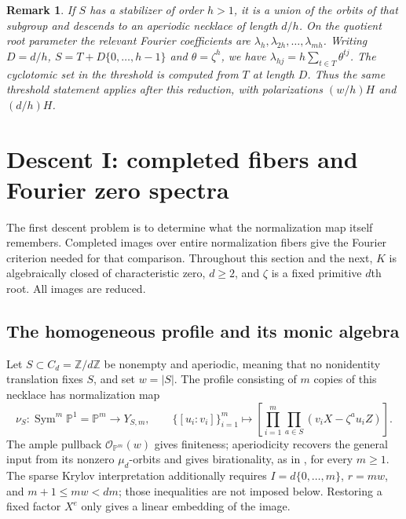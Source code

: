 \documentclass[10pt,fleqn]{article}
\numberwithin{equation}{section}
\newtheorem{remark}[theorem]{Remark}
\newcommand{\PP}{\mathbb P}
\newcommand{\sym}{\operatorname{Sym}}
\begin{document}
\begin{remark}\label{v6:norm:periodic-reduction}
If $S$ has a stabilizer of order $h>1$, it is a union of the orbits
of that subgroup and descends to an aperiodic necklace of length
$d/h$.  On the quotient root parameter the relevant Fourier
coefficients are $\lambda_h,\lambda_{2h},\ldots,\lambda_{mh}$.
Writing $D=d/h$, $S=T+D\{0,\ldots,h-1\}$ and
$\theta=\zeta^h$, we have
$\lambda_{hj}=h\sum_{t\in T}\theta^{tj}$.
The cyclotomic set in the threshold is computed from $T$
at length $D$.
Thus the same threshold statement applies after this reduction,
with polarizations $(w/h)H$ and $(d/h)H$.
\end{remark}
\section{Descent I: completed fibers and Fourier zero spectra}
\label{v6:spec:homogeneous-section}

The first descent problem is to determine what the normalization map itself remembers.  Completed images over entire normalization fibers give the Fourier criterion needed for that comparison.  Throughout this section and the next,
$K$ is algebraically closed of characteristic zero, $d\ge2$, and
$\zeta$ is a fixed primitive $d$th root.  All images are reduced.

\subsection{The homogeneous profile and its monic algebra}

Let $S\subset C_d=\mathbb Z/d\mathbb Z$ be nonempty and aperiodic, meaning
that no nonidentity translation fixes $S$, and set $w=|S|$.  The profile
consisting of $m$ copies of this necklace has normalization map
\begin{equation}\label{v6:spec:homogeneous-map}
 \nu_S:\sym^m\PP^1=\PP^m\longrightarrow Y_{S,m},\qquad
 \{[u_i:v_i]\}_{i=1}^m\longmapsto
 \left[\prod_{i=1}^m\prod_{a\in S}(v_iX-\zeta^a u_iZ)\right].
\end{equation}
The ample pullback $\mathcal O_{\PP^m}(w)$ gives finiteness;
aperiodicity recovers the general input from its nonzero $\mu_d$-orbits
and gives birationality, as in \cite[Theorem~5.4]{LiProfileGeometry}, for
every $m\ge1$.  The sparse Krylov interpretation additionally
requires $I=d\{0,\ldots,m\}$, $r=mw$, and $m+1\le mw<dm$;
those inequalities are not imposed below.  Restoring a fixed factor
$X^e$ only gives a linear embedding of the image.
\end{document}

